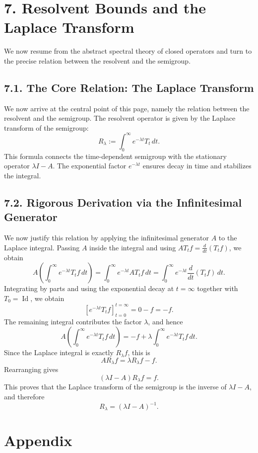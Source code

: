 \documentclass[11pt]{article}
\theoremstyle{definition}
\theoremstyle{remark}
\DeclareMathOperator{\Id}{Id}
\begin{document}
\section*{7. Resolvent Bounds and the Laplace Transform}
We now resume from the abstract spectral theory of closed operators and turn to the precise relation between the resolvent and the semigroup.

\subsection*{7.1. The Core Relation: The Laplace Transform}
We now arrive at the central point of this page, namely the relation between the resolvent and the semigroup. The resolvent operator is given by the Laplace transform of the semigroup:
\[
R_\lambda
:=
\int_0^\infty e^{-\lambda t}T_t\,dt.
\]
This formula connects the time-dependent semigroup with the stationary operator \(\lambda I-A\). The exponential factor \(e^{-\lambda t}\) ensures decay in time and stabilizes the integral.

\subsection*{7.2. Rigorous Derivation via the Infinitesimal Generator}
We now justify this relation by applying the infinitesimal generator \(A\) to the Laplace integral.
Passing \(A\) inside the integral and using \(AT_t f=\frac{d}{dt}(T_t f)\), we obtain
\[
A\left(\int_0^\infty e^{-\lambda t}T_t f\,dt\right)
=
\int_0^\infty e^{-\lambda t}AT_t f\,dt
=
\int_0^\infty e^{-\lambda t}\frac{d}{dt}(T_t f)\,dt.
\]
Integrating by parts and using the exponential decay at \(t=\infty\) together with \(T_0=\Id\), we obtain
\[
\left[e^{-\lambda t}T_t f\right]_{t=0}^{t=\infty}
=
0-f
=
-f.
\]
The remaining integral contributes the factor \(\lambda\), and hence
\[
A\left(\int_0^\infty e^{-\lambda t}T_t f\,dt\right)
=
-f+\lambda\int_0^\infty e^{-\lambda t}T_t f\,dt.
\]
Since the Laplace integral is exactly \(R_\lambda f\), this is
\[
AR_\lambda f
=
\lambda R_\lambda f-f.
\]
Rearranging gives
\[
(\lambda I-A)R_\lambda f
=
f.
\]
This proves that the Laplace transform of the semigroup is the inverse of \(\lambda I-A\), and therefore
\[
R_\lambda=(\lambda I-A)^{-1}.
\]

\section*{Appendix}
\end{document}
